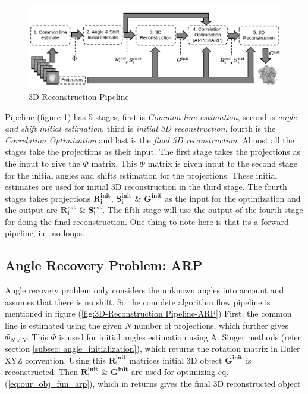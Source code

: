 \documentclass[twoside]{iitbreport}
\begin{document}
\begin{figure}[H]
\includegraphics[width=1\textwidth]{3d-reconstrction-pipepline.png}
\centering
\captionsetup{justification=centering}
\caption{3D-Reconstruction Pipeline }
\label{fig:3D-Reconstruction Pipeline}
\end{figure}

Pipeline (figure \ref{fig:3D-Reconstruction Pipeline}) has 5 stages, first is  \textit{Common line estimation}, second is  \textit{angle and shift initial estimation}, third is \textit{initial 3D reconstruction}, fourth is the \textit{Correlation Optimization} and  last is the \textit{final 3D reconstruction}. Almost all the stages take the projections as their input. The first stage takes the projections as the input to give the $\Phi$ matrix. This $\Phi$ matrix is given input to the second stage for the initial angles and shifts estimation for the projections. These initial estimates are used for initial 3D reconstruction in the third stage. The fourth stages takes projections $\boldsymbol{R_i^{init}}$, $\boldsymbol{S_i^{init}}$ \& $\boldsymbol{G^{init}}$ as the input for the optimization and the output are $\boldsymbol{R_i^{est}}$ \& $\boldsymbol{S_i^{est}}$. The fifth stage will use the output of the fourth stage for doing the final reconstruction. One thing to note here is that its a forward pipeline, i.e. no loops.

\subsection{Angle Recovery Problem: ARP} \label{subsec:ARP-EXP}

Angle recovery problem only considers the unknown angles into account and assumes that there is no shift. So the complete algorithm flow pipeline is mentioned in figure (\ref{fig:3D-Reconstruction Pipeline-ARP}) First, the common line is estimated using the given $N$ number of projections, which further gives $\Phi_{N\times N}$. This $\Phi$ is used for initial angles estimation using A. Singer methods (refer section \ref{subsec: angle_initialization}), which returns the rotation matrix in Euler XYZ convention. Using this $\boldsymbol{R_i^{init}}$ matrices initial 3D object $\boldsymbol{G^{init}}$ is reconstructed. Then $\boldsymbol{R_i^{init}}$ \& $\boldsymbol{G^{init}}$ are used for optimizing eq. (\ref{eq:our_obj_fun_arp}), which in returns gives the final 3D reconstructed object
\end{document}
